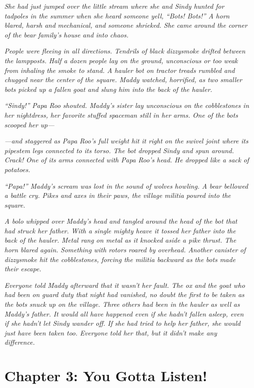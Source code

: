 \documentclass[10pt]{article}
\begin{document}
\emph{She had just jumped over the little stream where she and Sindy
hunted for tadpoles in the summer when she heard someone yell, ``Bots!
Bots!'' A horn blared, harsh and mechanical, and someone shrieked. She
came around the corner of the bear family's house and into chaos.}

\emph{People were fleeing in all directions. Tendrils of black
dizzysmoke drifted between the lampposts. Half a dozen people lay on the
ground, unconscious or too weak from inhaling the smoke to stand. A
hauler bot on tractor treads rumbled and chugged near the center of the
square. Maddy watched, horrified, as two smaller bots picked up a fallen
goat and slung him into the back of the hauler.}

\emph{``Sindy!'' Papa Roo shouted. Maddy's sister lay unconscious on the
cobblestones in her nightdress, her favorite stuffed spaceman still in
her arms. One of the bots scooped her up---}

\emph{---and staggered as Papa Roo's full weight hit it right on the
swivel joint where its pipestem legs connected to its torso. The bot
dropped Sindy and spun around. Crack! One of its arms connected with
Papa Roo's head. He dropped like a sack of potatoes.}

\emph{``Papa!'' Maddy's scream was lost in the sound of wolves howling.
A bear bellowed a battle cry. Pikes and axes in their paws, the village
militia poured into the square.}

\emph{A bolo whipped over Maddy's head and tangled around the head of
the bot that had struck her father. With a single mighty heave it tossed
her father into the back of the hauler. Metal rang on metal as it
knocked aside a pike thrust. The horn blared again. Something with
rotors roared by overhead. Another canister of dizzysmoke hit the
cobblestones, forcing the militia backward as the bots made their
escape.}

\emph{Everyone told Maddy afterward that it wasn't her fault. The ox and
the goat who had been on guard duty that night had vanished, no doubt
the first to be taken as the bots snuck up on the village. Three others
had been in the hauler as well as Maddy's father. It would all have
happened even if she hadn't fallen asleep, even if she hadn't let Sindy
wander off. If she had tried to help her father, she would just have
been taken too. Everyone told her that, but it didn't make any
difference.}

\newpage
\section{Chapter 3: You Gotta Listen!}
\end{document}
